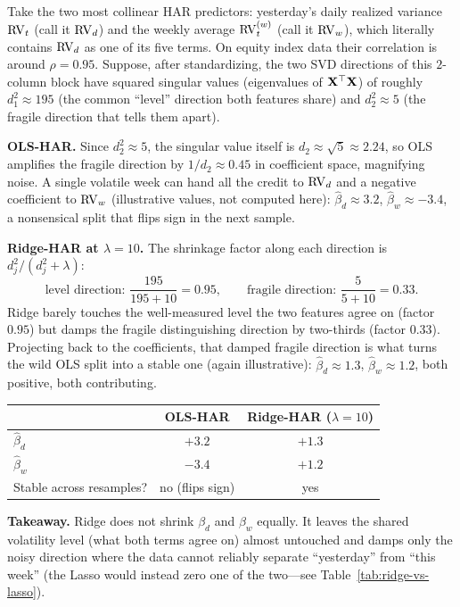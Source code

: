 \begin{workedexample}
Take the two most collinear HAR predictors: yesterday's daily realized variance $\operatorname{RV}_t$ (call it $\operatorname{RV}_d$) and the weekly average $\operatorname{RV}^{(w)}_t$ (call it $\operatorname{RV}_w$), which literally contains $\operatorname{RV}_d$ as one of its five terms.
On equity index data their correlation is around $\rho = 0.95$.
Suppose, after standardizing, the two SVD directions of this $2$-column block have squared singular values (eigenvalues of $\mathbf{X}^\top\mathbf{X}$) of roughly $d_1^2 \approx 195$ (the common ``level'' direction both features share) and $d_2^2 \approx 5$ (the fragile direction that tells them apart).

\textbf{OLS-HAR.}
Since $d_2^2 \approx 5$, the singular value itself is $d_2 \approx \sqrt{5} \approx 2.24$, so OLS amplifies the fragile direction by $1/d_2 \approx 0.45$ in coefficient space, magnifying noise.
A single volatile week can hand all the credit to $\operatorname{RV}_d$ and a negative coefficient to $\operatorname{RV}_w$ (illustrative values, not computed here): $\hat\beta_d \approx 3.2$, $\hat\beta_w \approx -3.4$, a nonsensical split that flips sign in the next sample.

\textbf{Ridge-HAR at $\lambda = 10$.}
The shrinkage factor along each direction is $d_j^2/(d_j^2+\lambda)$:
\[
  \text{level direction: } \frac{195}{195+10} = 0.95, \qquad
  \text{fragile direction: } \frac{5}{5+10} = 0.33.
\]
Ridge barely touches the well-measured level the two features agree on (factor $0.95$) but damps the fragile distinguishing direction by two-thirds (factor $0.33$).
Projecting back to the coefficients, that damped fragile direction is what turns the wild OLS split into a stable one (again illustrative): $\hat\beta_d \approx 1.3$, $\hat\beta_w \approx 1.2$, both positive, both contributing.

\medskip
\begin{center}
\begin{tabular}{@{} l c c @{}}
\toprule
 & \textbf{OLS-HAR} & \textbf{Ridge-HAR ($\lambda=10$)} \\
\midrule
$\hat\beta_d$ & $+3.2$ & $+1.3$ \\
$\hat\beta_w$ & $-3.4$ & $+1.2$ \\
Stable across resamples? & no (flips sign) & yes \\
\bottomrule
\end{tabular}
\end{center}
\medskip

\textbf{Takeaway.}
Ridge does not shrink $\beta_d$ and $\beta_w$ equally.
It leaves the shared volatility level (what both terms agree on) almost untouched and damps only the noisy direction where the data cannot reliably separate ``yesterday'' from ``this week'' (the Lasso would instead zero one of the two---see Table~\ref{tab:ridge-vs-lasso}).
\end{workedexample}

